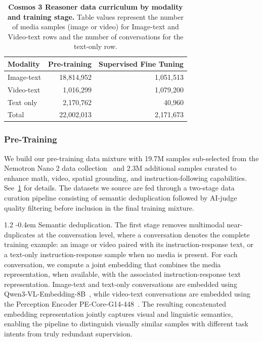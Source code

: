 \documentclass{llmxive}
\makeatletter
\providecommand{\paragraph}{  \@startsection{paragraph}{4}{\z@}    {1\baselineskip \@plus .2\baselineskip}    {-0.4em}    {\normalfont\normalsize\bfseries}}
\providecommand{\arraystretch}{1.5}
\makeatother
\begin{document}
\begin{table}[!htbp]
\centering
\renewcommand{\arraystretch}{1.5}
\setlength{\tabcolsep}{7pt}
\small
\begin{tabular}{lrr}
\toprule
\textbf{Modality}
    & \textbf{Pre-training}
    & \textbf{Supervised Fine Tuning } \\
\midrule
Image-text      & 18,814,952 & 1,051,513 \\
Video-text      & 1,016,299 & 1,079,200 \\
Text only       & 2,170,762 & 40,960 \\
Total           & 22,002,013 & 2,171,673 \\
\bottomrule
\end{tabular}
\caption{\textbf{Cosmos 3 Reasoner data curriculum by modality and training stage.} Table values represent the number of media samples (image or video) for Image-text and Video-text rows and the number of conversations for the text-only row.}
\label{tab:data_reas_summary}
\end{table}

\subsubsection{Pre-Training}
\label{subsubsec::data_reas_pretrain}

We build our pre-training data mixture with 19.7M samples sub-selected from the Nemotron Nano 2 data collection~\citep{nvidia2025nvidianemotronnanov2} and 2.3M additional samples curated to enhance math, video, spatial grounding, and instruction-following capabilities. See~\cref{tab:data_reas_summary} for details.
The datasets we source are fed through a two-stage data curation pipeline consisting of semantic deduplication followed by AI-judge quality filtering before inclusion in the final training mixture.

\paragraph{Semantic deduplication.}
The first stage removes multimodal near-duplicates at the conversation level, where a conversation denotes the complete training example: an image or video paired with its instruction-response text, or a text-only instruction-response sample when no media is present. For each conversation, we compute a joint embedding that combines the media representation, when available, with the associated instruction-response text representation. Image-text and text-only conversations are embedded using Qwen3-VL-Embedding-8B~\citep{qwen3vlembedding}, while video-text conversations are embedded using the Perception Encoder PE-Core-G14-448~\citep{bolya2025PerceptionEncoder}. The resulting concatenated embedding representation jointly captures visual and linguistic semantics, enabling the pipeline to distinguish visually similar samples with different task intents from truly redundant supervision. 
\end{document}
